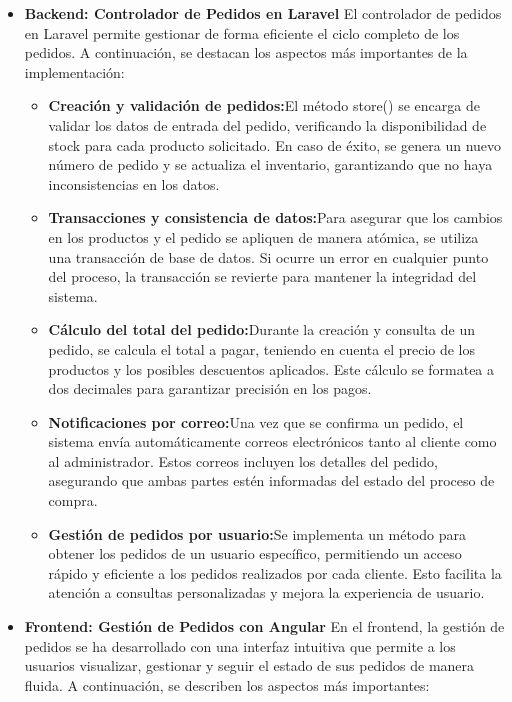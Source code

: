 \begin{itemize}
    \item \textbf{Backend: Controlador de Pedidos en Laravel} 
    El controlador de pedidos en Laravel permite gestionar de forma eficiente el ciclo completo de los pedidos. A continuación, se destacan los aspectos más importantes de la implementación:

    \begin{itemize}

        \item \textbf{Creación y validación de pedidos:}El método store() se encarga de validar los datos de entrada del pedido, verificando la disponibilidad de stock para cada producto solicitado. En caso de éxito, se genera un nuevo número de pedido y se actualiza el inventario, garantizando que no haya inconsistencias en los datos.

        \item \textbf{Transacciones y consistencia de datos:}Para asegurar que los cambios en los productos y el pedido se apliquen de manera atómica, se utiliza una transacción de base de datos. Si ocurre un error en cualquier punto del proceso, la transacción se revierte para mantener la integridad del sistema.

        \item \textbf{Cálculo del total del pedido:}Durante la creación y consulta de un pedido, se calcula el total a pagar, teniendo en cuenta el precio de los productos y los posibles descuentos aplicados. Este cálculo se formatea a dos decimales para garantizar precisión en los pagos.

        \item \textbf{Notificaciones por correo:}Una vez que se confirma un pedido, el sistema envía automáticamente correos electrónicos tanto al cliente como al administrador. Estos correos incluyen los detalles del pedido, asegurando que ambas partes estén informadas del estado del proceso de compra.

        \item \textbf{Gestión de pedidos por usuario:}Se implementa un método para obtener los pedidos de un usuario específico, permitiendo un acceso rápido y eficiente a los pedidos realizados por cada cliente. Esto facilita la atención a consultas personalizadas y mejora la experiencia de usuario.

    \end{itemize}
    
    \item \textbf{Frontend: Gestión de Pedidos con Angular}
    En el frontend, la gestión de pedidos se ha desarrollado con una interfaz intuitiva que permite a los usuarios visualizar, gestionar y seguir el estado de sus pedidos de manera fluida. A continuación, se describen los aspectos más importantes:
    

\end{itemize}
